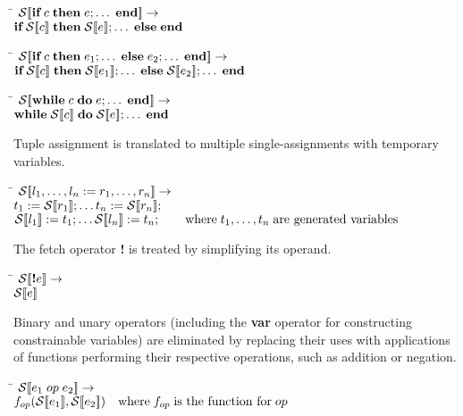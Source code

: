 %
\begin{tabbing}
\qquad \= \quad \kill
$\ST{\text{\bf if}\; c\;\text{\bf then}\; e;\dots\;\text{\bf end}} \rightarrow$\\
\>$\text{\bf if}\; \ST{c}\;\text{\bf then}\; \ST{e};\dots\;\text{\bf else}\;\text{\bf end}$
\end{tabbing}
%
\begin{tabbing}
\qquad \= \quad \kill
$\ST{\text{\bf if}\; c\;\text{\bf then}\; e_1;\dots\;\text{\bf else}\;e_2;\dots\;\text{\bf end}} \rightarrow$\\
\>$\text{\bf if}\; \ST{c}\;\text{\bf then}\; \ST{e_1};\dots\;\text{\bf else}\; \ST{e_2};\dots\;\text{\bf end}$
\end{tabbing}
%
\begin{tabbing}
\qquad \= \quad \kill
$\ST{\text{\bf while}\; c\;\text{\bf do}\; e;\dots\;\text{\bf end}} \rightarrow$\\
\>$\text{\bf while}\; \ST{c}\;\text{\bf do}\; \ST{e};\dots\;\text{\bf end}$
\end{tabbing}
%
Tuple assignment is translated to multiple single-assignments with
temporary variables.
%
\begin{tabbing}
\qquad \= \quad \kill
$\ST{l_1,\dots,l_n := r_1,\dots,r_n} \rightarrow$\\
\>$t_1 := \ST{r_1};\dots t_n := \ST{r_n};$\\
\>$\ST{l_1} := t_1;\dots \ST{l_n} := t_n;\qquad \text{where}\; t_1,\dots,t_n\;\text{are generated variables}$
\end{tabbing}
%
The fetch operator {\bf !} %
is treated by simplifying its operand.
%
\begin{tabbing}
\qquad \= \quad \kill
$\ST{\text{\bf !}e} \rightarrow$\\
\>{\bf !}$\ST{e}$
\end{tabbing}
%
%
Binary and unary operators (including the {\bf var} operator for
constructing constrainable variables) are eliminated by replacing
their uses with applications of functions performing their respective
operations, such as addition or negation.
%
\begin{tabbing}
\qquad \= \quad \kill
$\ST{e_1 \;op\; e_2} \rightarrow$\\
\>$f_{op}(\ST{e_1}, \ST{e_2})\quad\text{where}\; f_{op} \;\text{is the function for}\; op$
\end{tabbing}
